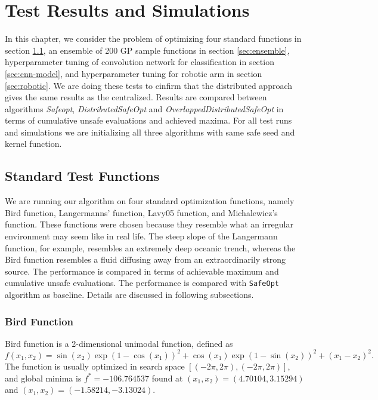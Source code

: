 \chapter{Test Results and Simulations}
\label{ch:results}

In this chapter, we consider the problem of optimizing four standard functions in section \ref{sec:std-test-functions}, an ensemble of 200 GP sample functions in section \ref{sec:ensemble}, hyperparameter tuning of convolution network for classification in section \ref{sec:cnn-model}, and hyperparameter tuning for robotic arm in section \ref{sec:robotic}.
We are doing these tests to cinfirm that the distributed approach gives the same results as the centralized.
Results are compared between algorithms \textit{Safeopt}, \textit{DistributedSafeOpt} and \textit{OverlappedDistributedSafeOpt} in terms of cumulative unsafe evaluations and achieved maxima. For all test runs and simulations we are initializing all three algorithms with same safe seed and kernel function. 

\section{Standard Test Functions}\label{sec:std-test-functions}
We are running our algorithm on four standard optimization functions, namely Bird function, Langermanns' function, Lavy05 function, and Michalewicz's function. These functions were chosen because they resemble what an irregular environment may seem like in real life. The steep slope of the Langermann function, for example, resembles an extremely deep oceanic trench, whereas the Bird function resembles a fluid diffusing away from an extraordinarily strong source. The performance is compared in terms of achievable maximum and cumulative unsafe evaluations. 
The performance is compared with \texttt{SafeOpt} algorithm as baseline. Details are discussed in following subsections.

\subsection{Bird Function}
Bird function is a 2-dimensional unimodal function, defined as
$$ f(x_1, x_2) = \sin(x_2) \exp (1-\cos(x_1))^2 + \cos(x_1)\exp(1-\sin(x_2))^2 + (x_1 - x_2)^2. $$
The function is usually optimized in search space $ [ (-2\pi, 2\pi), (-2\pi, 2\pi) ] $, and global minima is $f^*=-106.764537$ found at $(x_1, x_2)=(4.70104, 3.15294)$ and $(x_1, x_2)=(-1.58214, -3.13024)$.

